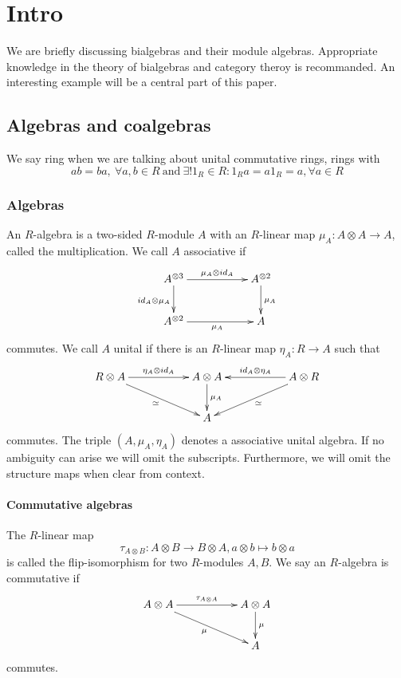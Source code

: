 \documentclass[10pt,a4paper]{article}
\author{moi}
\begin{document}
\section{Intro}
We are briefly discussing bialgebras and their module algebras. Appropriate knowledge in the theory of bialgebras and category theroy is recommanded. An interesting example will be a central part of this paper.
\subsection{Algebras and coalgebras}
We say ring when we are talking about unital commutative rings, rings with
$$a b = b a,\ \forall a, b \in R \ \mathrm{and}\ \exists! 1_R \in R: 1_R a = a 1_R = a, \forall a \in R$$
\subsubsection{Algebras}
An $R$-algebra is a two-sided $R$-module $A$ with an $R$-linear map $\mu_A : A \otimes A \longrightarrow A$, called the multiplication. We call $A$ associative if
$$\xymatrix{
A^{\otimes 3} \ar[rr]^{\mu_A \otimes id_A} \ar[d]_{id_A \otimes \mu_A} && A^{\otimes 2}\ar[d]^{\mu_A}\\
A^{\otimes 2} \ar[rr]_{\mu_A} && A\\
}$$
commutes. We call $A$ unital if there is an $R$-linear map $\eta_A : R \longrightarrow A$ such that
$$\xymatrix{
R \otimes A \ar[rr]^{\eta_A \otimes id_A} \ar[rrd]_\simeq & & A \otimes A\ar[d]^{\mu_A} && A \otimes R \ar[ll]_{id_A \otimes \eta_A}\ar[lld]^\simeq\\
&&A&&\\
}$$
commutes. The triple $(A, \mu_A, \eta_A)$ denotes a associative unital algebra. If no ambiguity can arise we will omit the subscripts. Furthermore, we will omit the structure maps when clear from context.
\paragraph{Commutative algebras}
The $R$-linear map
$$\tau_{A\otimes B} : A \otimes B \longrightarrow B \otimes A, a \otimes b \longmapsto b \otimes a$$
is called the flip-isomorphism for two $R$-modules $A, B$. We say an $R$-algebra is commutative if
$$\xymatrix{
A \otimes A \ar[rr]^{\tau_{A\otimes A}} \ar[rrd]_{\mu}&& A \otimes A\ar[d]^\mu\\
&&A\\
}$$
commutes.
\end{document}

